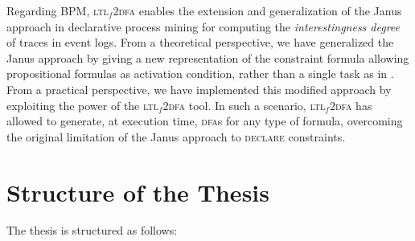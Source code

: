 Regarding \textsc{BPM}, \textsc{ltl}$_f2$\textsc{dfa} enables the extension and generalization of the Janus approach in declarative process mining for computing the \textit{interestingness degree} of traces in event logs. From a theoretical perspective, we have generalized the Janus approach by giving a new representation of the constraint formula allowing propositional formulas as activation condition, rather than a single task as in \cite{cecconi2018interestingness}. From a practical perspective, we have implemented this modified approach by exploiting the power of the \textsc{ltl}$_f2$\textsc{dfa} tool. In such a scenario, \textsc{ltl}$_f2$\textsc{dfa} has allowed to generate, at execution time, \textsc{dfa}s for any type of formula, overcoming the original limitation of the Janus approach to \textsc{declare} constraints.
\section{Structure of the Thesis}
The thesis is structured as follows:
